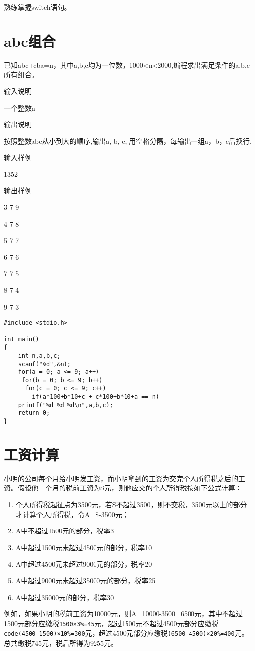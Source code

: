 \begin{note}[要点]
	熟练掌握switch语句。
\end{note}

\section{abc组合}	
已知abc+cba=n，其中a,b,c均为一位数，1000<n<2000,编程求出满足条件的a,b,c所有组合。

输入说明
	
一个整数n

输出说明
	
按照整数abc从小到大的顺序,输出a, b, c, 用空格分隔，每输出一组a，b，c后换行.

输入样例
	
1352

输出样例
	
3 7 9

4 7 8

5 7 7

6 7 6

7 7 5

8 7 4

9 7 3

\begin{lstlisting}
#include <stdio.h>

int main()
{
	int n,a,b,c;
	scanf("%d",&n);
	for(a = 0; a <= 9; a++)
	 for(b = 0; b <= 9; b++)
	  for(c = 0; c <= 9; c++)
	    if(a*100+b*10+c + c*100+b*10+a == n)
	printf("%d %d %d\n",a,b,c);
	return 0;
} 
\end{lstlisting}

\section{工资计算}
小明的公司每个月给小明发工资，而小明拿到的工资为交完个人所得税之后的工资。假设他一个月的税前工资为S元，则他应交的个人所得税按如下公式计算：
\begin{enumerate}
	\item 个人所得税起征点为3500元，若S不超过3500，则不交税，3500元以上的部分才计算个人所得税，令A=S-3500元；
	\item A中不超过1500元的部分，税率3%
	\item A中超过1500元未超过4500元的部分，税率10%
	\item A中超过4500元未超过9000元的部分，税率20%
	\item A中超过9000元未超过35000元的部分，税率25%
	\item A中超过35000元的部分，税率30%
\end{enumerate}
例如，如果小明的税前工资为10000元，则A=10000-3500=6500元，其中不超过1500元部分应缴税\lstinline|1500×3%=45|元，超过1500元不超过4500元部分应缴税\lstinline|code(4500-1500)×10%=300|元，超过4500元部分应缴税\lstinline|(6500-4500)×20%=400|元。总共缴税745元，税后所得为9255元。

